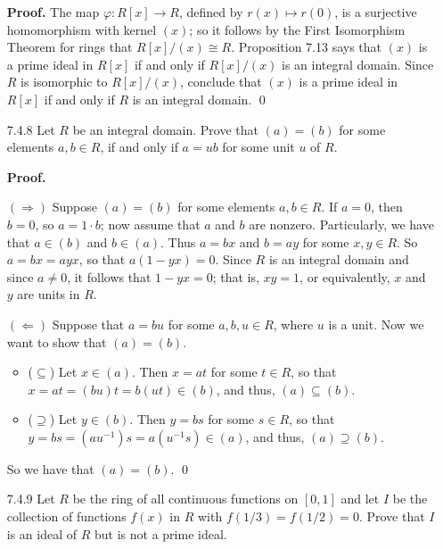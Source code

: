 \begin{enumerate}
      \textbf{Proof.} The map $\varphi : R[x] \rightarrow R$, defined by
      $r(x) \mapsto r(0)$, is a surjective homomorphism with kernel $(x)$; so
      it follows by the First Isomorphism Theorem for rings that
      $R[x]/(x) \cong R$. Proposition 7.13 says that $(x)$ is a prime ideal in
      $R[x]$ if and only if $R[x]/(x)$ is an integral domain. Since $R$ is 
      isomorphic to $R[x]/(x)$, conclude that $(x)$ is a prime ideal in $R[x]$
      if and only if $R$ is an integral domain. \qed
   \item[7.4.8]   Let $R$ be an integral domain. Prove that $(a) = (b)$ for some
                  elements $a, b \in R$, if and only if $a = ub$ for some unit
                  $u$ of $R$.
                  
      \textbf{Proof.}
      
      $(\Rightarrow)$ Suppose $(a) = (b)$ for some elements $a, b \in R$. If
      $a = 0$, then $b = 0$, so $a = 1 \cdot b$; now assume that $a$ and $b$ are
      nonzero. Particularly, we have that $a \in (b)$ and $b \in (a)$. Thus
      $a = bx$ and $b = ay$ for some $x, y \in R$. So $a = bx = ayx$, so that
      $a(1 - yx) = 0$. Since $R$ is an integral domain and since $a \neq 0$, it
      follows that $1 - yx = 0$; that is, $xy = 1$, or equivalently, $x$ and
      $y$ are units in $R$.
      
      $(\Leftarrow)$ Suppose that $a = bu$ for some $a, b, u \in R$, where $u$
      is a unit. Now we want to show that $(a) = (b)$.
      \begin{itemize}
         \item ($\subseteq$) Let $x \in (a)$. Then $x = at$ for some $t \in R$,
               so that $x = at = (bu)t = b(ut) \in (b)$, and thus,
               $(a) \subseteq (b)$.
         \item ($\supseteq$) Let $y \in (b)$. Then $y = bs$ for some $s \in R$,
               so that $y = bs = (au^{-1})s = a(u^{-1}s) \in (a)$, and thus,
               $(a) \supseteq (b)$.
      \end{itemize}
      So we have that $(a) = (b)$.  \qed
   \item[7.4.9]   Let $R$ be the ring of all continuous functions on $[0, 1]$
                  and let $I$ be the collection of functions $f(x)$ in $R$ with
                  $f(1/3) = f(1/2) = 0$. Prove that $I$ is an ideal of $R$ but
                  is not a prime ideal.
                  

\end{enumerate}
